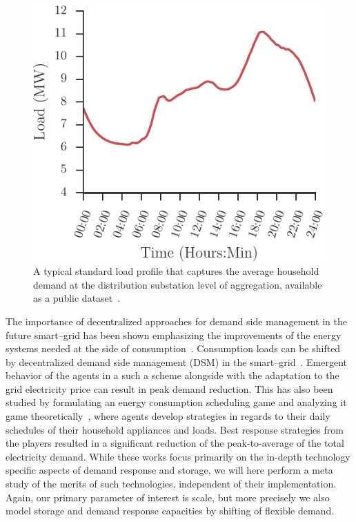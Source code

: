 \documentclass[conference]{IEEEtran}
\begin{document}
\begin{figure}[t!]
\centering
\includegraphics[width=0.7\columnwidth]{figures/slp.pdf}
\caption{A typical standard load profile that captures the average household demand at the distribution substation level of aggregation, available as a public dataset~\cite{SLPsource}.}
\label{fig:slp}
\vspace{-0.5cm}
\end{figure}


\newpage
The importance of decentralized approaches for demand side management in the future smart--grid has been shown emphasizing the improvements of the energy systems needed at the side of consumption~\cite{palensky2011demand}. Consumption loads can be shifted by decentralized demand side management (DSM) in the smart--grid~\cite{Ramchurn2011a}. Emergent behavior of the agents in a such a scheme alongside with the adaptation to the grid electricity price can result in peak demand reduction. This has also been studied by formulating an energy consumption scheduling game and analyzing it game theoretically~\cite{Mohsenian-Rad2010}, where agents develop strategies in regards to their daily schedules of their household appliances and loads. Best response strategies from the players resulted in a significant reduction of the peak-to-average of the total electricity demand. 
While these works focus primarily on the in-depth technology specific aspects of demand response and storage, we will here perform a meta study of the merits of such technologies, independent of their implementation. Again, our primary parameter of interest is scale, but more precisely we also model storage and demand response capacities by shifting of flexible demand.
\end{document}
